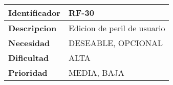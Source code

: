 \begin{center}
    \begin{tabular}{|p{2.6cm}|p{12cm}|}
    \hline
    \textbf{Identificador} & RF-30\\
    \hline
    \textbf{Descripcion} & Edicion de peril de usuario\\
    \hline
    \textbf{Necesidad} & DESEABLE, OPCIONAL\\
    \hline
    \textbf{Dificultad} & ALTA\\
    \hline
    \textbf{Prioridad} & MEDIA, BAJA\\
    \hline
    \end{tabular}
\end{center}
